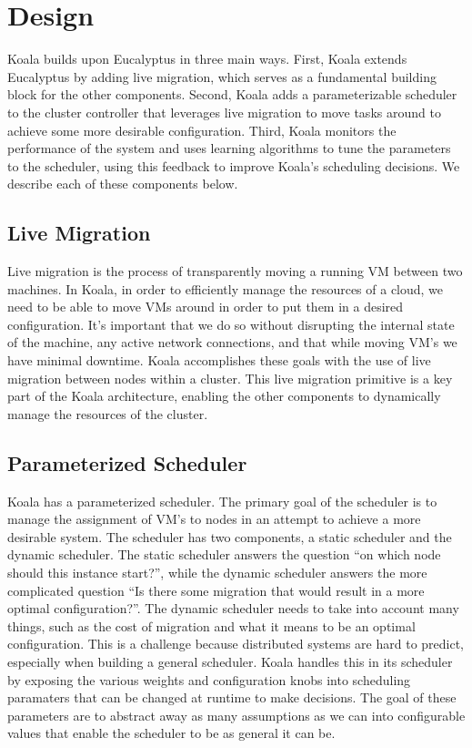 \section{Design}

Koala builds upon Eucalyptus in three main ways.  First, Koala extends
Eucalyptus by adding live migration, which serves as a fundamental building
block for the other components.  Second, Koala adds a parameterizable scheduler
to the cluster controller that leverages live migration to move tasks around to
achieve some more desirable configuration.  Third, Koala monitors the
performance of the system and uses learning algorithms to tune the parameters to
the scheduler, using this feedback to improve Koala's scheduling decisions.  We
describe each of these components below.

\subsection{Live Migration}
Live migration is the process of transparently moving a running VM between two machines.  In Koala, in order to efficiently manage the resources of a cloud, we need to be able to move VMs around in order to put them in a desired configuration.  It's important that we do so without disrupting the internal state of the machine, any active network connections, and that while moving VM's we have minimal downtime.  Koala accomplishes these goals with the use of live migration between nodes within a cluster.  This live migration primitive is a key part of the Koala architecture, enabling the other components to dynamically manage the resources of the cluster.

\subsection{Parameterized Scheduler}
Koala has a parameterized scheduler.  The primary goal of the scheduler is to manage the assignment of VM's to nodes in an attempt to achieve a more desirable system.  The scheduler has two components, a static scheduler and the dynamic scheduler.  The static scheduler answers the question ``on which node should this instance start?'', while the dynamic scheduler answers the more complicated question ``Is there some migration that would result in a more optimal configuration?''.  The dynamic scheduler needs to take into account many things, such as the cost of migration and what it means to be an optimal configuration.  This is a challenge because distributed systems are hard to predict, especially when building a general scheduler.  Koala handles this in its scheduler by exposing the various weights and configuration knobs into scheduling paramaters that can be changed at runtime to make decisions.  The goal of these parameters are to abstract away as many assumptions as we can into configurable values that enable the scheduler to be as general it can be.

